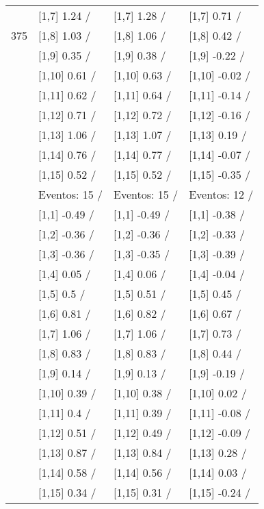 \begin{table}
\begin{tabular}[t]{llll}
 & {}[1,7] 1.24  / & {}[1,7] 1.28  / & {}[1,7] 0.71  /\\
375 & {}[1,8] 1.03  / & {}[1,8] 1.06  / & {}[1,8] 0.42  /\\
\addlinespace
 & {}[1,9] 0.35  / & {}[1,9] 0.38  / & {}[1,9] -0.22  /\\
 & {}[1,10] 0.61  / & {}[1,10] 0.63  / & {}[1,10] -0.02  /\\
 & {}[1,11] 0.62  / & {}[1,11] 0.64  / & {}[1,11] -0.14  /\\
 & {}[1,12] 0.71  / & {}[1,12] 0.72  / & {}[1,12] -0.16  /\\
 & {}[1,13] 1.06  / & {}[1,13] 1.07  / & {}[1,13] 0.19  /\\
\addlinespace
 & {}[1,14] 0.76  / & {}[1,14] 0.77  / & {}[1,14] -0.07  /\\
 & {}[1,15] 0.52  / & {}[1,15] 0.52  / & {}[1,15] -0.35  /\\
 & Eventos:  15 / & Eventos:  15 / & Eventos:  12 /\\
 & {}[1,1] -0.49  / & {}[1,1] -0.49  / & {}[1,1] -0.38  /\\
 & {}[1,2] -0.36  / & {}[1,2] -0.36  / & {}[1,2] -0.33  /\\
\addlinespace
 & {}[1,3] -0.36  / & {}[1,3] -0.35  / & {}[1,3] -0.39  /\\
 & {}[1,4] 0.05  / & {}[1,4] 0.06  / & {}[1,4] -0.04  /\\
 & {}[1,5] 0.5  / & {}[1,5] 0.51  / & {}[1,5] 0.45  /\\
 & {}[1,6] 0.81  / & {}[1,6] 0.82  / & {}[1,6] 0.67  /\\
 & {}[1,7] 1.06  / & {}[1,7] 1.06  / & {}[1,7] 0.73  /\\
\addlinespace
500 & {}[1,8] 0.83  / & {}[1,8] 0.83  / & {}[1,8] 0.44  /\\
 & {}[1,9] 0.14  / & {}[1,9] 0.13  / & {}[1,9] -0.19  /\\
 & {}[1,10] 0.39  / & {}[1,10] 0.38  / & {}[1,10] 0.02  /\\
 & {}[1,11] 0.4  / & {}[1,11] 0.39  / & {}[1,11] -0.08  /\\
 & {}[1,12] 0.51  / & {}[1,12] 0.49  / & {}[1,12] -0.09  /\\
\addlinespace
 & {}[1,13] 0.87  / & {}[1,13] 0.84  / & {}[1,13] 0.28  /\\
 & {}[1,14] 0.58  / & {}[1,14] 0.56  / & {}[1,14] 0.03  /\\
 & {}[1,15] 0.34  / & {}[1,15] 0.31  / & {}[1,15] -0.24  /\\
\bottomrule
\end{tabular}
\end{table}
